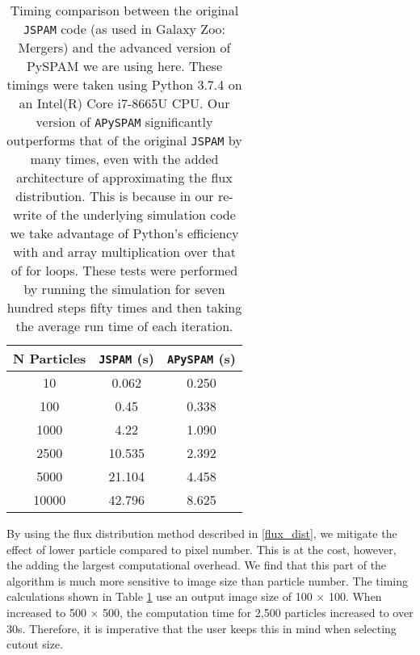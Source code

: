 \begin{table}
\centering
\begin{tabular}{|c|c|c|}
\hline
N Particles & \texttt{JSPAM} (s) & \texttt{APySPAM} (s) \\
\hline
10 & 0.062 & 0.250 \\
100 & 0.45 & 0.338 \\
1000 & 4.22 & 1.090 \\
2500 & 10.535 & 2.392 \\
5000 & 21.104 & 4.458 \\
10000 & 42.796 & 8.625 \\
\hline
\end{tabular}
\caption{Timing comparison between the original \texttt{JSPAM} code (as used in Galaxy Zoo: Mergers) and the advanced version of PySPAM we are using here. These timings were taken using Python 3.7.4 on an Intel(R) Core i7-8665U CPU. Our version of \texttt{APySPAM} significantly outperforms that of the original \texttt{JSPAM} by many times, even with the added architecture of approximating the flux distribution. This is because in our re-write of the underlying simulation code we take advantage of Python's efficiency with \DIFdelbeginFL {}\DIFdelendFL \DIFaddbeginFL {}\DIFaddendFL and array multiplication over that of for loops. These tests were performed by running the simulation for seven hundred steps fifty times and then taking the average run time of each iteration.}
\label{tab:timings}
\end{table}

By using the flux distribution method described in \DIFdelbegin {}\DIFdelend \DIFaddbegin {}\DIFaddend \ref{flux_dist}, we mitigate the effect of lower particle compared to pixel number. This is at the cost, however, the adding the largest computational overhead. We find that this part of the algorithm is much more sensitive to image size than particle number. The timing calculations shown in Table \ref{tab:timings} use an output image size of 100 $\times$ 100. When increased to 500 $\times$ 500, the computation time for 2,500 particles increased to over 30s. Therefore, it is imperative that the user keeps this in mind when selecting cutout size.

